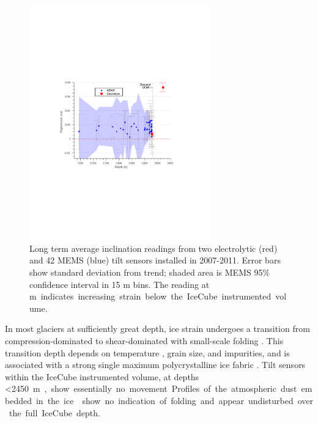 \begin{figure}[!h]
	\centering
	\includegraphics[width=0.7\textwidth]{graphics/geometry/tilt4.pdf}
	\caption{Long term average inclination readings from two electrolytic (red) and 42 MEMS (blue) tilt sensors installed in 2007-2011.  Error bars show standard deviation from trend; shaded area is MEMS 95\% confidence interval in 15 m bins.  The reading at \unit[2540]m indicates increasing strain below the IceCube instrumented volume.}
	\label{fig:tilt}
\end{figure}

In most glaciers at sufficiently great depth, ice strain undergoes a transition from compression-dominated to shear-dominated with small-scale folding \cite{montagnat14,jansen16}.  This transition depth depends on temperature \cite{price2002temperature}, grain size, and impurities, and is associated with a strong single maximum polycrystalline ice fabric \cite{cuffey10}.  Tilt sensors within the IceCube instrumented volume, at depths \SI{<2450}m,  show essentially no movement.  Profiles of the atmospheric dust embedded in the ice \cite{I3:dustlogger} show no indication of folding and appear undisturbed over the full IceCube depth.
